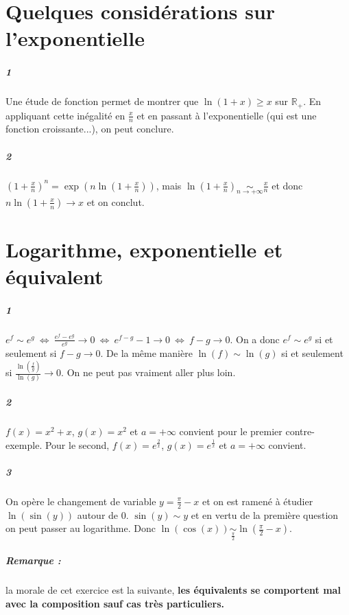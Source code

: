 \documentclass[10pt,a4paper]{article}
\begin{document}
\section{Quelques considérations sur l'exponentielle}
\subparagraph{1}Une étude de fonction permet de montrer que $\ln(1+x) \ge x$ sur $\mathbb{R}_+$. En appliquant cette inégalité en $\frac{x}{n}$ et en passant à l'exponentielle (qui est une fonction croissante...), on peut conclure.
\subparagraph{2}$(1+ \frac{x}{n})^{n} = \exp\left( n \ln (1+ \frac{x}{n}) \right)$, mais $\ln(1+ \frac{x}{n}) \underset{n \rightarrow +\infty}{\sim} \frac{x}{n}$ et donc $n \ln (1+ \frac{x}{n}) \rightarrow x$ et on conclut.

\section{Logarithme, exponentielle et équivalent}
\subparagraph{1} ${e^f \sim e^g \ \Leftrightarrow \ \frac{e^f -e^g}{e^g} \rightarrow 0 \ \Leftrightarrow \ e^{f-g} - 1 \rightarrow 0 \ \Leftrightarrow \ f-g \rightarrow 0}$. On a donc $e^f \sim e^g$ si et seulement si $f-g \rightarrow 0$. De la même manière $\ln(f) \sim \ln(g)$ si et seulement si $\frac{\ln \left(\frac{f}{g} \right)}{\ln(g)} \rightarrow 0$. On ne peut pas vraiment aller plus loin.
\subparagraph{2}$f(x) = x^2 +x $, $g(x) = x^2$ et $a =+\infty$ convient pour le premier contre-exemple. Pour le second, $f(x) = e^{\frac{2}{x}}$, $g(x) = e^{\frac{1}{x}}$ et $a = +\infty$ convient. 
\subparagraph{3}
On opère le changement de variable $y = \frac{\pi}{2}-x$ et on est ramené à étudier $\ln(\sin(y))$ autour de $0$. $\sin(y) \sim y$ et en vertu de la première question on peut passer au logarithme. Donc $\ln(\cos(x)) \underset{\frac{\pi}{2}}{\sim} \ln(\frac{\pi}{2}-x)$.

\subparagraph{Remarque :} la morale de cet exercice est la suivante, \textbf{les équivalents se comportent mal avec la composition sauf cas très particuliers.}
\end{document}
